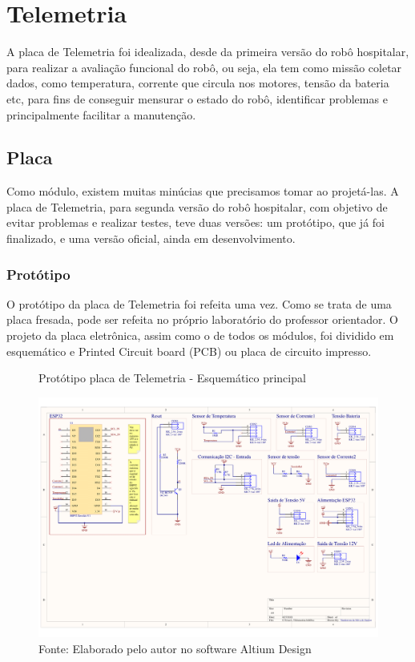\documentclass[../poliXuniversity_hospital_-USP-report.tex]{subfiles}
\begin{document}
\clearpage

\section{Telemetria}

A placa de Telemetria foi idealizada, desde da primeira versão do robô hospitalar, para realizar a avaliação funcional do robô, ou seja, ela tem como missão coletar dados, como temperatura, corrente que circula nos motores, tensão da bateria etc, para fins de conseguir mensurar o estado do robô, identificar problemas e principalmente facilitar a manutenção.

\subsection{Placa}

Como módulo, existem muitas minúcias que precisamos tomar ao projetá-las. A placa de Telemetria, para segunda versão do robô hospitalar, com objetivo de evitar problemas e realizar testes, teve duas versões: um protótipo, que já foi finalizado, e uma versão oficial, ainda em desenvolvimento. 

\subsubsection{Protótipo}

O protótipo da placa de Telemetria foi refeita uma vez. Como se trata de uma placa fresada, pode ser refeita no próprio laboratório do professor orientador. O projeto da placa eletrônica, assim como o de todos os módulos, foi dividido em esquemático e Printed Circuit board (PCB)  ou placa de circuito impresso. 

\begin{figure}[!h]
\centering
    \caption{Protótipo placa de Telemetria - Esquemático principal }
    \centering %
    \includegraphics[width=17cm]{modulos/Telemetria-1.png}
    \caption*{Fonte: Elaborado pelo autor no software Altium Design\cite{altium21} }
    \label{Protótipo placa de ## - Esquemático principal}
\end{figure}
\end{document}
